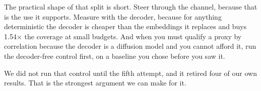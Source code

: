 \documentclass[
  10pt,
]{article}
\theoremstyle{plain}
\theoremstyle{definition}
\begin{document}
The practical shape of that split is short. Steer through the channel,
because that is the use it supports. Measure with the decoder, because
for anything deterministic the decoder is cheaper than the embeddings it
replaces and buys 1.54× the coverage at small budgets. And when you must
qualify a proxy by correlation because the decoder is a diffusion model
and you cannot afford it, run the decoder-free control first, on a
baseline you chose before you saw it.

We did not run that control until the fifth attempt, and it retired four
of our own results. That is the strongest argument we can make for it.
\end{document}
